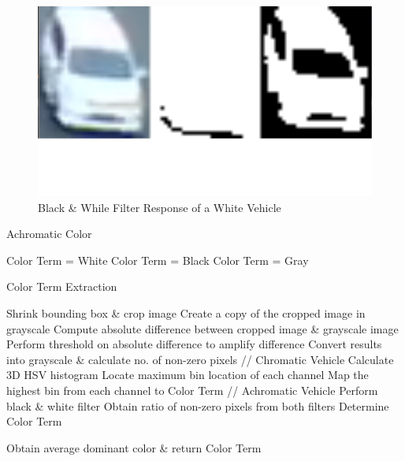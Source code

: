 \begin{figure}[hbt!]\centering
\includegraphics[width=.7\textwidth]{image/general/blackwhitefilter.PNG}
\caption{Black \& While Filter Response of a White Vehicle}
\label{fig:blackwhite_filter}
\end{figure}


 \begin{algorithm}[!h]
  \caption{Achromatic Color}
  \label{algo:achromatic}
  \begin{algorithmic}[1]
  
	\State Color Term = White  	
  	\State Color Term = Black
  \Else
  	\State Color Term = Gray
  \EndIf
  
  \end{algorithmic}
\end{algorithm}

 
 \begin{algorithm}[!h]
  \caption{Color Term Extraction}
  \label{algo:colorExtract}
  \begin{algorithmic}[1]
        \State Shrink bounding box \& crop image
        \State Create a copy of the cropped image in grayscale
        \State Compute absolute difference between cropped image \& grayscale image
        \State Perform threshold on absolute difference to amplify difference
        \State Convert results into grayscale \& calculate no. of non-zero pixels
                \State // Chromatic Vehicle
                \State Calculate 3D HSV histogram  
                \State Locate maximum bin location of each channel
                \State Map the highest bin from each channel to Color Term
            \Else 
                \State // Achromatic Vehicle
                \State Perform black \& white filter 
                \State Obtain ratio of non-zero pixels from both filters
                \State Determine Color Term
            \EndIf

    \EndFor
    \State Obtain average dominant color \& return Color Term
  \end{algorithmic}
\end{algorithm}


